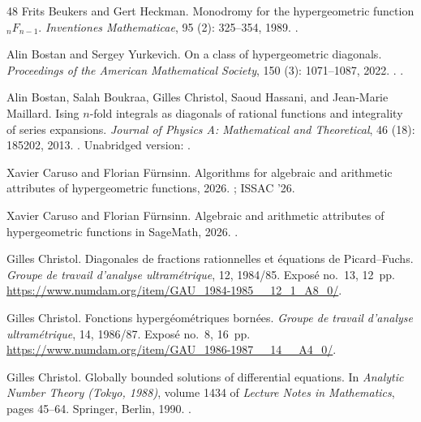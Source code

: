 \documentclass[11pt]{amsart}
\theoremstyle{definition}
\theoremstyle{remark}
\numberwithin{equation}{section}
\begin{document}
\begin{thebibliography}{48}
Frits Beukers and Gert Heckman.
\newblock Monodromy for the hypergeometric function {${}_nF_{n-1}$}.
\newblock \emph{Inventiones Mathematicae}, 95 (2): 325--354,
  1989.
\newblock {}.

Alin Bostan and Sergey Yurkevich.
\newblock On a class of hypergeometric diagonals.
\newblock \emph{Proceedings of the American Mathematical Society}, 150
  (3): 1071--1087, 2022.
\newblock {}.
\newblock {}.

Alin Bostan, Salah Boukraa, Gilles Christol, Saoud Hassani, and Jean-Marie
  Maillard.
\newblock Ising $n$-fold integrals as diagonals of rational functions and
  integrality of series expansions.
\newblock \emph{Journal of Physics A: Mathematical and Theoretical},
  46 (18): 185202, 2013.
\newblock {}.
\newblock Unabridged version: .

Xavier Caruso and Florian F{\"u}rnsinn.
\newblock Algorithms for algebraic and arithmetic attributes of hypergeometric
  functions, 2026{}.
\newblock {}; ISSAC '26.

Xavier Caruso and Florian F{\"u}rnsinn.
\newblock Algebraic and arithmetic attributes of hypergeometric functions in
  {SageMath}, 2026{}.
\newblock {}.

Gilles Christol.
\newblock Diagonales de fractions rationnelles et {\'e}quations de
  {P}icard--{F}uchs.
\newblock \emph{Groupe de travail d'analyse ultram{\'e}trique}, 12, 1984/85.
\newblock Expos{\'e} no.~13, 12~pp.
\newblock \url{https://www.numdam.org/item/GAU_1984-1985__12_1_A8_0/}.

Gilles Christol.
\newblock Fonctions hyperg{\'e}om{\'e}triques born{\'e}es.
\newblock \emph{Groupe de travail d'analyse ultram{\'e}trique}, 14, 1986/87.
\newblock Expos{\'e} no.~8, 16~pp.
\newblock \url{https://www.numdam.org/item/GAU_1986-1987__14__A4_0/}.

Gilles Christol.
\newblock Globally bounded solutions of differential equations.
\newblock In \emph{Analytic Number Theory (Tokyo, 1988)}, volume 1434 of
  \emph{Lecture Notes in Mathematics}, pages 45--64. Springer, Berlin, 1990.
\newblock {}.


\end{thebibliography}
\end{document}

